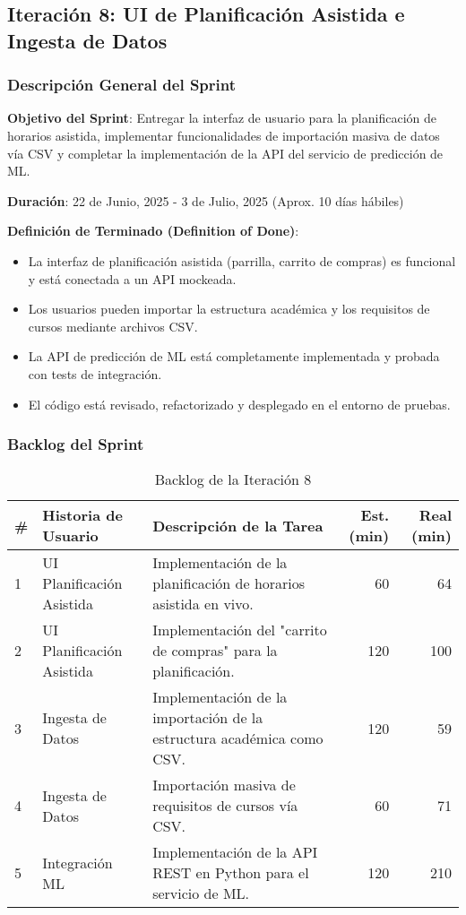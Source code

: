 \subsection{Iteración 8: UI de Planificación Asistida e Ingesta de Datos}

\subsubsection{Descripción General del Sprint}

\textbf{Objetivo del Sprint}: Entregar la interfaz de usuario para la planificación de horarios asistida, implementar funcionalidades de importación masiva de datos vía CSV y completar la implementación de la API del servicio de predicción de ML.

\textbf{Duración}: 22 de Junio, 2025 - 3 de Julio, 2025 (Aprox. 10 días hábiles)

\textbf{Definición de Terminado (Definition of Done)}: 
\begin{itemize}
    \item La interfaz de planificación asistida (parrilla, carrito de compras) es funcional y está conectada a un API mockeada.
    \item Los usuarios pueden importar la estructura académica y los requisitos de cursos mediante archivos CSV.
    \item La API de predicción de ML está completamente implementada y probada con tests de integración.
    \item El código está revisado, refactorizado y desplegado en el entorno de pruebas.
\end{itemize}

\subsubsection{Backlog del Sprint}

\begin{table}[H]
\caption{Backlog de la Iteración 8}
\label{tab:iteration-8-backlog}
\begin{tabularx}{\textwidth}{@{}llXrr@{}}
\toprule
\textbf{\#} & \textbf{Historia de Usuario} & \textbf{Descripción de la Tarea} & \textbf{Est. (min)} & \textbf{Real (min)} \\
\midrule
    1 & UI Planificación Asistida & Implementación de la planificación de horarios asistida en vivo. & 60 & 64 \\
    2 & UI Planificación Asistida & Implementación del "carrito de compras" para la planificación. & 120 & 100 \\
    3 & Ingesta de Datos & Implementación de la importación de la estructura académica como CSV. & 120 & 59 \\
    4 & Ingesta de Datos & Importación masiva de requisitos de cursos vía CSV. & 60 & 71 \\
    5 & Integración ML & Implementación de la API REST en Python para el servicio de ML. & 120 & 210 \\
\bottomrule
\end{tabularx}
\end{table}

